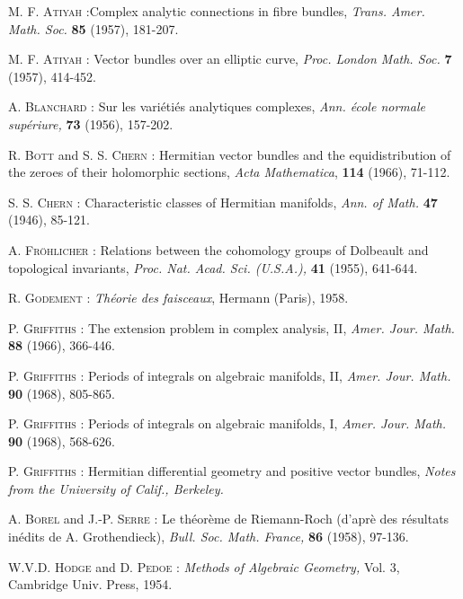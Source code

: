 \begin{thebibliography}{99}
 \textsc{M. F. Atiyah :}\pageoriginale Complex analytic connections in fibre bundles, {\em Trans. Amer. Math. Soc.} {\bf 85} (1957), 181-207.

 \textsc{M. F. Atiyah :} Vector bundles over an elliptic curve, {\em Proc. London Math. Soc.} {\bf 7} (1957), 414-452.

 \textsc{A. Blanchard :} Sur les vari\'eti\'es analytiques complexes, {\em Ann. \'ecole normale sup\'eriure,} {\bf 73} (1956), 157-202.

 \textsc{R. Bott} and \textsc{S. S. Chern :} Hermitian vector bundles and the equidistribution of the zeroes of their holomorphic sections, {\em Acta Mathematica}, {\bf 114} (1966), 71-112.

 \textsc{S. S. Chern :} Characteristic classes of Hermitian manifolds, {\em Ann. of Math.} {\bf 47} (1946), 85-121.

 \textsc{A. Fr\"ohlicher :} Relations between the cohomology groups of Dolbeault and topological invariants, {\em Proc. Nat. Acad. Sci. (U.S.A.),} {\bf 41} (1955), 641-644.

 \textsc{R. Godement :} {\em Th\'eorie des faisceaux}, Hermann (Paris), 1958.

 \textsc{P. Griffiths :} The extension problem in complex analysis, II, {\em Amer. Jour. Math.} {\bf 88} (1966), 366-446.

 \textsc{P. Griffiths :} Periods of integrals on algebraic manifolds, II, {\em Amer. Jour. Math.} {\bf 90} (1968), 805-865.

 \textsc{P. Griffiths :} Periods of integrals on algebraic manifolds, I, {\em Amer. Jour. Math.} {\bf 90} (1968), 568-626.

 \textsc{P. Griffiths :} Hermitian differential geometry and positive vector bundles, {\em Notes from the University of Calif., Berkeley.}

 \textsc{A. Borel} and \textsc{J.-P. Serre :} Le th\'eor\`eme de Riemann-Roch (d'apr\`e des r\'esultats in\'edits de A. Grothendieck), {\em Bull. Soc. Math. France,} {\bf 86} (1958), 97-136.

 \textsc{W.V.D. Hodge} and \textsc{D. Pedoe :} {\em Methods of Algebraic Geometry,} Vol. 3, Cambridge Univ. Press, 1954.


\end{thebibliography}
